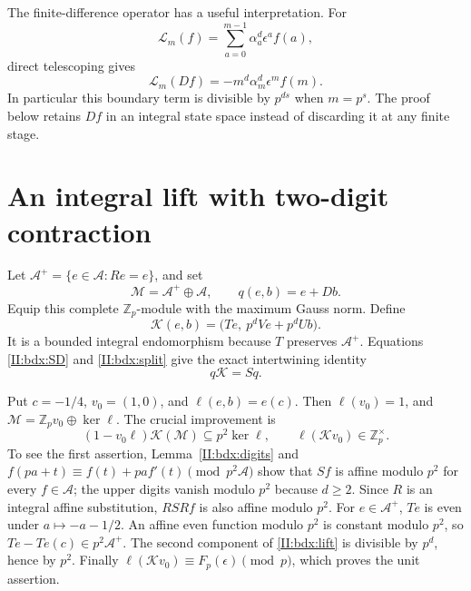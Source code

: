\documentclass[11pt,letterpaper]{article}
\theoremstyle{definition}
\theoremstyle{remark}
\begin{document}
The finite-difference operator has a useful interpretation. For
\[
 \mathcal L_m(f)=\sum_{a=0}^{m-1}\alpha_a^d\epsilon^a f(a),
\]
direct telescoping gives
\[
 \mathcal L_m(Df)=-m^d\alpha_m^d\epsilon^m f(m).
\]
In particular this boundary term is divisible by $p^{ds}$ when
$m=p^s$. The proof below retains $Df$ in an integral state space
instead of discarding it at any finite stage.

\section{An integral lift with two-digit contraction}

Let $\mathcal A^+=\{e\in\mathcal A:Re=e\}$, and set
\[
 \mathcal M=\mathcal A^+\oplus\mathcal A,\qquad
 q(e,b)=e+Db.
\]
Equip this complete $\mathbb Z_p$-module with the maximum Gauss norm.
Define
\begin{equation}\label{II:bdx:lift}
 \mathcal K(e,b)=\bigl(Te,\ p^dVe+p^dUb\bigr).
\end{equation}
It is a bounded integral endomorphism because $T$ preserves
$\mathcal A^+$. Equations \eqref{II:bdx:SD} and \eqref{II:bdx:split} give
the exact intertwining identity
\begin{equation}\label{II:bdx:intertwine}
 q\mathcal K=S q.
\end{equation}

Put $c=-1/4$, $v_0=(1,0)$, and $\ell(e,b)=e(c)$.
Then $\ell(v_0)=1$, and $\mathcal M=\mathbb Z_pv_0\oplus\ker\ell$.
The crucial improvement is
\begin{equation}\label{II:bdx:rankone}
 (1-v_0\ell)\mathcal K(\mathcal M)\subseteq p^2\ker\ell,
 \qquad \ell(\mathcal K v_0)\in\mathbb Z_p^\times.
\end{equation}
To see the first assertion, Lemma~\ref{II:bdx:digits} and
$f(pa+t)\equiv f(t)+pa f'(t)\pmod{p^2\mathcal A}$ show that $Sf$
is affine modulo $p^2$ for every $f\in\mathcal A$; the upper digits
vanish modulo $p^2$ because $d\ge2$.
Since $R$ is an integral affine substitution, $RSRf$ is also affine
modulo $p^2$. For $e\in\mathcal A^+$, $Te$ is even under $a\mapsto-a-1/2$.
An affine even function modulo $p^2$ is constant modulo $p^2$,
so $Te-Te(c)\in p^2\mathcal A^+$. The second component of
\eqref{II:bdx:lift} is divisible by $p^d$, hence by $p^2$.
Finally $\ell(\mathcal K v_0)\equiv F_p(\epsilon)\pmod p$,
which proves the unit assertion.
\end{document}
